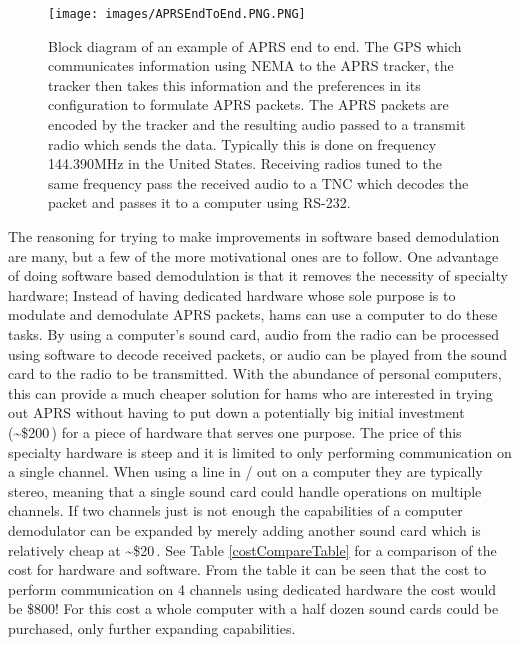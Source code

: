 \begin{figure}
  \centering
	\texttt{[image: images/APRSEndToEnd.PNG.PNG]} 
	\caption{Block diagram of an example of APRS end to end. The GPS which communicates information using NEMA to the APRS tracker, the tracker then takes this information and the preferences in its configuration to formulate APRS packets. The APRS packets are encoded by the tracker and the resulting audio passed to a transmit radio which sends the data. Typically this is done on frequency 144.390MHz in the United States. Receiving radios tuned to the same frequency pass the received audio to a TNC which decodes the packet and passes it to a computer using RS-232.}
   \label{APRSEndToEnd.PNG}
\end{figure}

The reasoning for trying to make improvements in software based demodulation are many, but a few of the more motivational ones are to follow. One advantage of doing software based demodulation is that it removes the necessity of specialty hardware; Instead of having dedicated hardware whose sole purpose is to modulate and demodulate APRS packets, hams can use a computer to do these tasks. By using a computer's sound card, audio from the radio can be processed using software to decode received packets, or audio can be played from the sound card to the radio to be transmitted. With the abundance of personal computers, this can provide a much cheaper solution for hams who are interested in trying out APRS without having to put down a potentially big initial investment (\textasciitilde\$200\,\cite{Kantronics2014,Outlet2014}) for a piece of hardware that serves one purpose. The price of this specialty hardware is steep and it is limited to only performing communication on a single channel. When using a line in / out on a computer they are typically stereo, meaning that a single sound card could handle operations on multiple channels. If two channels just is not enough the capabilities of a computer demodulator can be expanded by merely adding another sound card which is relatively cheap at \textasciitilde\$20\,\cite{Newegg}. See Table \ref{costCompareTable} for a comparison of the cost for hardware and software. From the table it can be seen that the cost to perform communication on 4 channels using dedicated hardware the cost would be \$800! For this cost a whole computer with a half dozen sound cards could be purchased, only further expanding capabilities.

